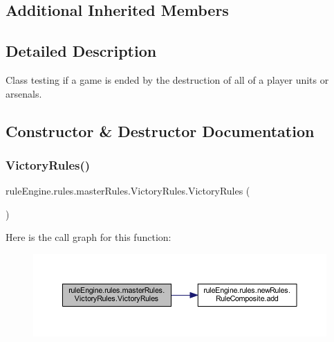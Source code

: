 \subsection*{Additional Inherited Members}


\subsection{Detailed Description}
Class testing if a game is ended by the destruction of all of a player units or arsenals. 

\subsection{Constructor \& Destructor Documentation}
\mbox{\label{classrule_engine_1_1rules_1_1master_rules_1_1_victory_rules_a586a33bc8e22dcf30843070346ec7425}} 
\subsubsection{\texorpdfstring{Victory\+Rules()}{VictoryRules()}}
{\footnotesize\ttfamily rule\+Engine.\+rules.\+master\+Rules.\+Victory\+Rules.\+Victory\+Rules (\begin{DoxyParamCaption}{ }\end{DoxyParamCaption})\hspace{0.3cm}{\ttfamily [inline]}}

Here is the call graph for this function\+:
\nopagebreak
\begin{figure}[H]
\begin{center}
\leavevmode
\includegraphics[width=350pt]{classrule_engine_1_1rules_1_1master_rules_1_1_victory_rules_a586a33bc8e22dcf30843070346ec7425_cgraph}
\end{center}
\end{figure}



